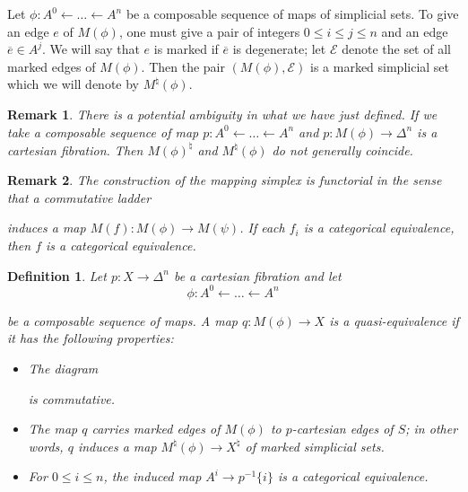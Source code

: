 \documentclass[12pt]{amsart}
\newcommand{\8}{\ensuremath{\infty}}
\newtheorem{definition}{Definition}
\newtheorem{remark}{Remark}
\begin{document}
Let $\phi:A^0\leftarrow \dots\leftarrow A^n$ be a composable sequence of maps of simplicial sets. To give an edge $e$ of $M(\phi)$, one must give a pair of integers $0\leq i\leq j\leq n$ and an edge $\overline{e}\in A^j$. We will say that $e$ is marked if $\overline{e}$ is degenerate; let $\mathcal{E}$ denote the set of all marked edges of $M(\phi)$. Then the pair $(M(\phi),\mathcal{E})$ is a marked simplicial set which we will denote by $M^\natural(\phi)$.

\begin{remark}
  There is a potential ambiguity in what we have just defined. If we take a composable sequence of map $p:A^0\leftarrow\dots\leftarrow A^n$ and $p:M(\phi)\rightarrow \Delta^n$ is a cartesian fibration. Then $M(\phi)^\natural$ and $M^\natural(\phi)$ do not generally coincide.
\end{remark}

\begin{remark}
  The construction of the mapping simplex is functorial in the sense that a commutative ladder
  induces a map $M(f):M(\phi)\rightarrow M(\psi)$. If each $f_i$ is a categorical equivalence, then $f$ is a categorical equivalence.
\end{remark}

\begin{definition}
  Let $p:X\rightarrow \Delta^n$ be a cartesian fibration and let
  $$
    \phi:A^0\leftarrow\dots\leftarrow A^n
  $$

  be a composable sequence of maps. A map $q:M(\phi)\rightarrow X$ is a quasi-equivalence if it has the following properties:
  \begin{itemize}
    \item The diagram
          is commutative.
    \item The map $q$ carries marked edges of $M(\phi)$ to $p$-cartesian edges of $S$; in other words, $q$ induces a map $M^\natural(\phi)\rightarrow X^\natural$ of marked simplicial sets.
    \item For $0\leq i\leq n$, the induced map $A^i\rightarrow p^{-1}\{i\}$ is a categorical equivalence.
  \end{itemize}
\end{definition}
\end{document}
